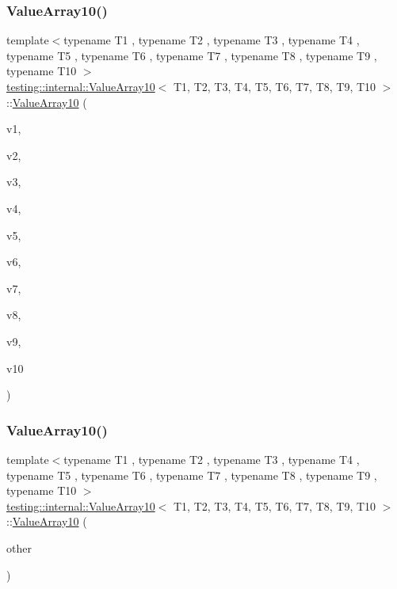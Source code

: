 \subsubsection{\texorpdfstring{ValueArray10()}{ValueArray10()}\hspace{0.1cm}{\footnotesize\ttfamily [1/2]}}
{\footnotesize\ttfamily template$<$typename T1 , typename T2 , typename T3 , typename T4 , typename T5 , typename T6 , typename T7 , typename T8 , typename T9 , typename T10 $>$ \\
\mbox{\hyperlink{classtesting_1_1internal_1_1ValueArray10}{testing\+::internal\+::\+Value\+Array10}}$<$ T1, T2, T3, T4, T5, T6, T7, T8, T9, T10 $>$\+::\mbox{\hyperlink{classtesting_1_1internal_1_1ValueArray10}{Value\+Array10}} (\begin{DoxyParamCaption}\item[{T1}]{v1,  }\item[{T2}]{v2,  }\item[{T3}]{v3,  }\item[{T4}]{v4,  }\item[{T5}]{v5,  }\item[{T6}]{v6,  }\item[{T7}]{v7,  }\item[{T8}]{v8,  }\item[{T9}]{v9,  }\item[{T10}]{v10 }\end{DoxyParamCaption})\hspace{0.3cm}{\ttfamily [inline]}}

\mbox{\label{classtesting_1_1internal_1_1ValueArray10_a05195c20e50321e51b2502c71c5ec8fa}} 
\subsubsection{\texorpdfstring{ValueArray10()}{ValueArray10()}\hspace{0.1cm}{\footnotesize\ttfamily [2/2]}}
{\footnotesize\ttfamily template$<$typename T1 , typename T2 , typename T3 , typename T4 , typename T5 , typename T6 , typename T7 , typename T8 , typename T9 , typename T10 $>$ \\
\mbox{\hyperlink{classtesting_1_1internal_1_1ValueArray10}{testing\+::internal\+::\+Value\+Array10}}$<$ T1, T2, T3, T4, T5, T6, T7, T8, T9, T10 $>$\+::\mbox{\hyperlink{classtesting_1_1internal_1_1ValueArray10}{Value\+Array10}} (\begin{DoxyParamCaption}\item[{const \mbox{\hyperlink{classtesting_1_1internal_1_1ValueArray10}{Value\+Array10}}$<$ T1, T2, T3, T4, T5, T6, T7, T8, T9, T10 $>$ \&}]{other }\end{DoxyParamCaption})\hspace{0.3cm}{\ttfamily [inline]}}




